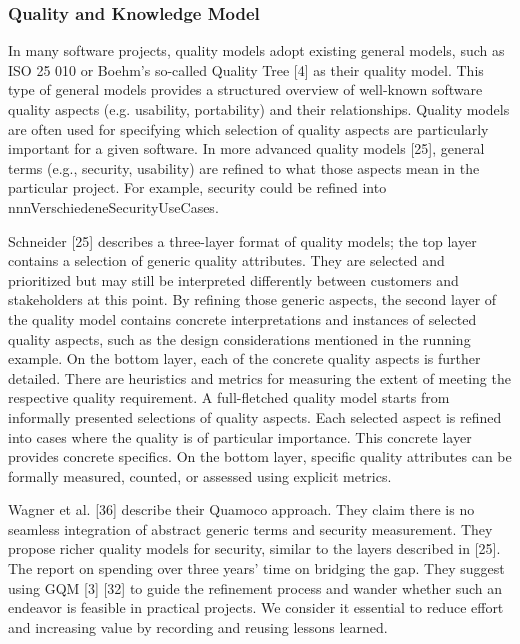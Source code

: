 \vspace{-0.5em}
\subsubsection*{Quality and Knowledge Model}
\vspace{-1em}
In many software projects, quality models adopt existing general models, such as ISO 25 010 or Boehm’s so-called Quality Tree [4] as their quality model. This type of general models provides a structured overview of well-known software quality aspects (e.g. usability, portability) and their relationships. Quality models are often used for specifying which selection of quality aspects are particularly important for a given software. In more advanced quality models [25], general terms (e.g., security, usability) are refined to what those aspects mean in the particular project. For example, security could be refined into nnnVerschiedeneSecurityUseCases. 

Schneider [25] describes a three-layer format of quality models; the top layer contains a selection of generic quality attributes. They are selected and prioritized but may still be interpreted differently between customers and stakeholders at this point. By refining those generic aspects, the second layer of the quality model contains concrete interpretations and instances of selected quality aspects, such as the design considerations mentioned in the running example. On the bottom layer, each of the concrete quality aspects is further detailed. There are heuristics and metrics for measuring the extent of meeting the respective quality requirement. A full-fletched quality model starts from informally presented selections of quality aspects. Each selected aspect is refined into cases where the quality is of particular importance. This concrete layer provides concrete specifics. On the bottom layer, specific quality attributes can be formally measured, counted, or assessed using explicit metrics. 

Wagner et al. [36] describe their Quamoco approach. They claim there is no seamless integration of abstract generic terms and security measurement.  They propose richer quality models for security, similar to the layers described in [25]. The report on spending over three years’ time on bridging the gap. They suggest using GQM [3] [32] to guide the refinement process and wander whether such an endeavor is feasible in practical projects. We consider it essential to reduce effort and increasing value by recording and reusing lessons learned.

